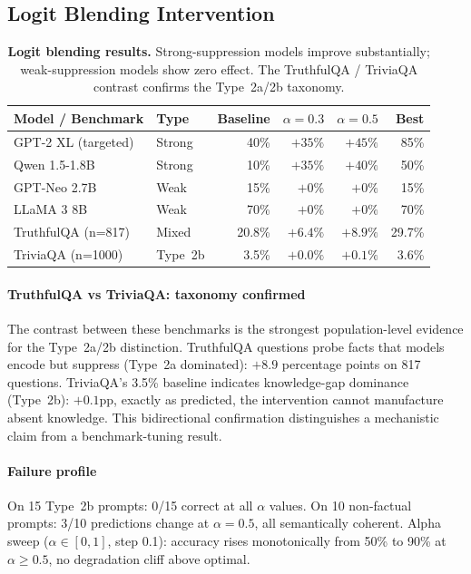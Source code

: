 \documentclass{article}
\begin{document}
\subsection{Logit Blending Intervention}

\begin{table}[htbp]
\caption{\textbf{Logit blending results.} Strong-suppression models improve
substantially; weak-suppression models show zero effect.
The TruthfulQA / TriviaQA contrast confirms the Type~2a/2b taxonomy.}
\label{tab:intervention}
\centering\small
\begin{tabular}{llrrrr}
\toprule
\textbf{Model / Benchmark} & \textbf{Type}
  & \textbf{Baseline} & $\alpha{=}0.3$ & $\alpha{=}0.5$ & \textbf{Best} \\
\midrule
GPT-2 XL (targeted)    & Strong & 40\%   & $+35\%$ & $+45\%$ & 85\%   \\
Qwen 1.5-1.8B          & Strong & 10\%   & $+35\%$ & $+40\%$ & 50\%   \\
GPT-Neo 2.7B           & Weak   & 15\%   & $+0\%$  & $+0\%$  & 15\%   \\
LLaMA 3 8B             & Weak   & 70\%   & $+0\%$  & $+0\%$  & 70\%   \\
\midrule
TruthfulQA (n=817)     & Mixed  & 20.8\% & $+6.4\%$& $+8.9\%$& 29.7\% \\
TriviaQA (n=1000)      & Type~2b&  3.5\% & $+0.0\%$& $+0.1\%$&  3.6\% \\
\bottomrule
\end{tabular}
\end{table}

\paragraph{TruthfulQA vs TriviaQA: taxonomy confirmed}
The contrast between these benchmarks is the strongest population-level
evidence for the Type~2a/2b distinction.
TruthfulQA questions probe facts that models encode but suppress (Type~2a
dominated): $+8.9$ percentage points on 817 questions.
TriviaQA's 3.5\% baseline indicates knowledge-gap dominance (Type~2b):
$+0.1$pp, exactly as predicted, the intervention cannot manufacture
absent knowledge.
This bidirectional confirmation distinguishes a mechanistic claim from a
benchmark-tuning result.

\paragraph{Failure profile}
On 15 Type~2b prompts: 0/15 correct at all $\alpha$ values.
On 10 non-factual prompts: 3/10 predictions change at $\alpha=0.5$,
all semantically coherent.
Alpha sweep ($\alpha\in[0,1]$, step 0.1): accuracy rises monotonically
from 50\% to 90\% at $\alpha\geq0.5$, no degradation cliff above optimal.
\end{document}
